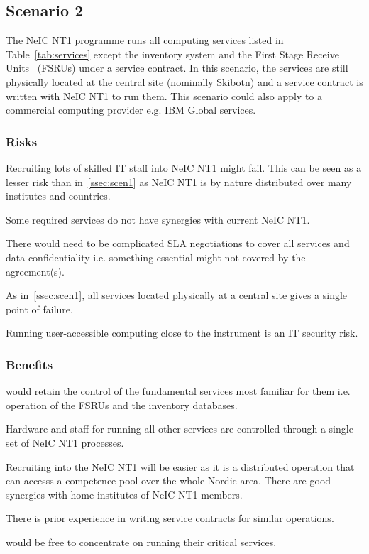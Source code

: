 \documentclass[12pt,a4paper]{article}
\newcommand{\nnt}{NeIC NT1\xspace}
\begin{document}
\subsection{Scenario 2}
\label{ssec:scen2}

The \nnt programme runs all computing services listed in Table~\ref{tab:services} except the \ED inventory system
and the First Stage Receive Units~\cite{fsru-tender} (FSRUs) under a service contract.
In this scenario, the services are still physically located at the central site (nominally Skibotn) and a
service contract is written with \nnt to run them.
This scenario could also apply to a commercial computing provider e.g. IBM Global services.

\subsubsection*{Risks}
\bitm
\item Recruiting lots of skilled IT staff into \nnt might fail. This can be seen as a lesser risk than in~\ref{ssec:scen1} as \nnt is by nature distributed over many institutes and countries.
\item Some \ED required services do not have synergies with current \nnt.
\item There would need to be complicated SLA negotiations to cover all services and data confidentiality i.e. something essential might not covered by the agreement(s).
\item As in~\ref{ssec:scen1}, all services located physically at a central site gives a single point of failure.
\item Running user-accessible computing close to the instrument is an IT security risk.
\eitm

\subsubsection*{Benefits}
\bitm
\item \EC would retain the control of the fundamental services most familiar for them i.e. operation of the FSRUs and the inventory databases.
\item Hardware and staff for running all other services are controlled through a single set of \nnt processes.
\item Recruiting into the \nnt will be easier as it is a distributed operation that can accesss a competence pool over the
  whole Nordic area. There are good synergies with home institutes of \nnt members.
\item There is prior experience in writing service contracts for similar operations.
\item \EC would be free to concentrate on running their critical services.
\eitm
\end{document}
